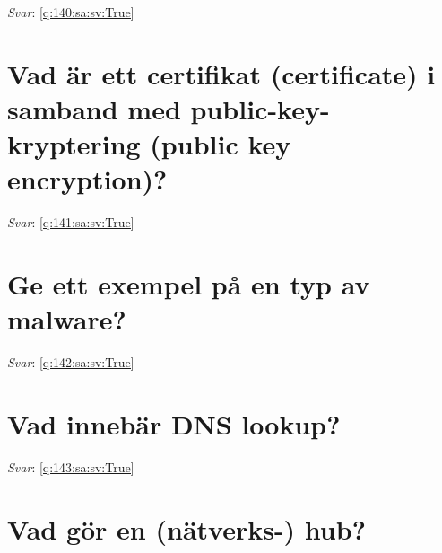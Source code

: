 \documentclass[a4paper,11pt,oneside]{book}
\begin{document}
\begin{sloppypar}
\vspace{1cm}

\textit{Svar}: \autoref{q:140:sa:sv:True}



\section{Vad \"ar ett certifikat (certificate) i samband med public-key-kryptering (public key encryption)?}

\label{q:141:sa:sv:False}

\vspace{2cm}

\noindent\makebox[\textwidth]{\hrulefill}

\vspace{1cm}

\textit{Svar}: \autoref{q:141:sa:sv:True}



\section{Ge ett exempel p\r{a} en typ av malware?}

\label{q:142:sa:sv:False}

\vspace{2cm}

\noindent\makebox[\textwidth]{\hrulefill}

\vspace{1cm}

\textit{Svar}: \autoref{q:142:sa:sv:True}



\section{Vad inneb\"ar DNS lookup?}

\label{q:143:sa:sv:False}

\vspace{2cm}

\noindent\makebox[\textwidth]{\hrulefill}

\vspace{1cm}

\textit{Svar}: \autoref{q:143:sa:sv:True}



\section{Vad g\"or en (n\"atverks-) hub?}


\end{sloppypar}
\end{document}
